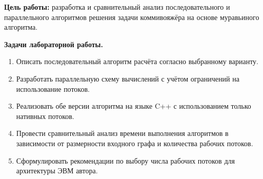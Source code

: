 
\textbf{Цель работы:} разработка и сравнительный анализ последовательного и параллельного
алгоритмов решения задачи коммивояжёра на основе муравьиного алгоритма.

\textbf{Задачи лабораторной работы.}
\begin{enumerate}
        \item Описать последовательный алгоритм расчёта согласно выбранному варианту.
        \item Разработать параллельную схему вычислений с учётом ограничений на использование потоков.
        \item Реализовать обе версии алгоритма на языке C++ с использованием только нативных потоков.
        \item Провести сравнительный анализ времени выполнения алгоритмов в зависимости от размерности входного графа и количества рабочих потоков.
        \item Сформулировать рекомендации по выбору числа рабочих потоков для архитектуры ЭВМ автора.
\end{enumerate}


\clearpage
